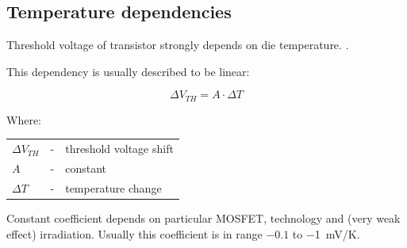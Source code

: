     \subsection{Temperature dependencies}
        Threshold voltage of transistor strongly depends on die temperature. \cite{managing_temperature_effects_in_nanoscale_adaptive_systems}.
        
        This dependency is usually described to be linear:
        
        $$\Delta V_{TH} = A \cdot \Delta T$$
        
        Where:
        
        \begin{tabular}{lcl}
            $\Delta V_{TH}$ & - & threshold voltage shift \\
            $A$ & - & constant \\
            $\Delta T$ & - & temperature change \\
        \end{tabular}
        \bigskip
        
        Constant coefficient depends on particular MOSFET, technology and (very weak effect) irradiation. Usually this coefficient is in range $-0.1$ to \SI{-1}{\milli\volt/\kelvin}.